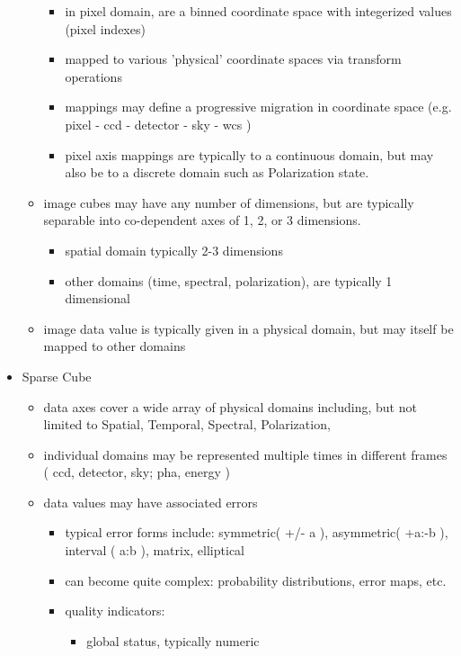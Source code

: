 \documentclass[11pt,a4paper]{ivoa}
\begin{document}
\begin{itemize}
\begin{itemize}
       \begin{itemize}
          \item in pixel domain, are a binned coordinate space with integerized values (pixel indexes) 
          \item mapped to various 'physical' coordinate spaces via transform operations 
          \item mappings may define a progressive migration in coordinate space (e.g. pixel - ccd - detector - sky - wcs ) 
          \item pixel axis mappings are typically to a continuous domain, but may also be to a discrete domain such as Polarization state.
       \end{itemize}
       \item image cubes may have any number of dimensions, but are typically separable into co-dependent axes of 1, 2, or 3 dimensions.
       \begin{itemize}
          \item spatial domain typically 2-3 dimensions
          \item other domains (time, spectral, polarization), are typically 1 dimensional
       \end{itemize}
       \item image data value is typically given in a physical domain, but may itself be mapped to other domains
    \end{itemize}
    \item Sparse Cube
    \begin{itemize}
       \item data axes cover a wide array of physical domains including, but not limited to Spatial, Temporal, Spectral, Polarization,
       \item individual domains may be represented multiple times in different frames ( ccd, detector, sky;  pha, energy )
       \item data values may have associated errors
       \begin{itemize}
          \item typical error forms include: symmetric( +/- a ), asymmetric( +a:-b ), interval ( a:b ), matrix, elliptical
          \item can become quite complex: probability distributions, error maps, etc.
          \item quality indicators:
          \begin{itemize}
             \item global status, typically numeric

\end{itemize}
\end{itemize}
\end{itemize}
\end{itemize}
\end{document}

